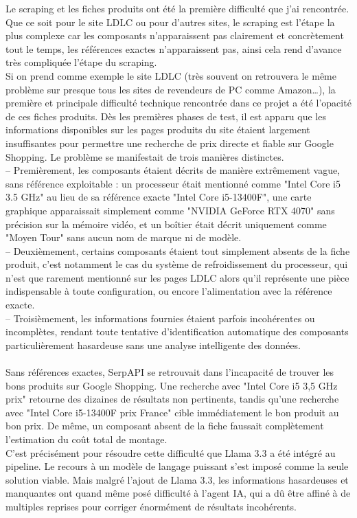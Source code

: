 \documentclass[a4paper, 12pt, twoside]{article}
\begin{document}
Le scraping et les fiches produits ont été la première difficulté que j'ai rencontrée.\\
Que ce soit pour le site LDLC ou pour d’autres sites, le scraping est l’étape la plus complexe car les composants n’apparaissent pas clairement et concrètement tout le temps, les références exactes n’apparaissent pas, ainsi cela rend d’avance très compliquée l’étape du scraping.\\
Si on prend comme exemple le site LDLC (très souvent on retrouvera le même problème sur presque tous les sites de revendeurs de PC comme Amazon…), la première et principale difficulté technique rencontrée dans ce projet a été l'opacité de ces fiches produits. Dès les premières phases de test, il est apparu que les informations disponibles sur les pages produits du site étaient largement insuffisantes pour permettre une recherche de prix directe et fiable sur Google Shopping. Le problème se manifestait de trois manières distinctes.\\
– Premièrement, les composants étaient décrits de manière extrêmement vague, sans référence exploitable : un processeur était mentionné comme "Intel Core i5 3.5 GHz" au lieu de sa référence exacte "Intel Core i5-13400F", une carte graphique apparaissait simplement comme "NVIDIA GeForce RTX 4070" sans précision sur la mémoire vidéo, et un boîtier était décrit uniquement comme "Moyen Tour" sans aucun nom de marque ni de modèle.\\
– Deuxièmement, certains composants étaient tout simplement absents de la fiche produit, c’est notamment le cas du système de refroidissement du processeur, qui n'est que rarement mentionné sur les pages LDLC alors qu'il représente une pièce indispensable à toute configuration, ou encore l’alimentation avec la référence exacte.\\
– Troisièmement, les informations fournies étaient parfois incohérentes ou incomplètes, rendant toute tentative d'identification automatique des composants particulièrement hasardeuse sans une analyse intelligente des données.\\
\\
Sans références exactes, SerpAPI se retrouvait dans l'incapacité de trouver les bons produits sur Google Shopping. Une recherche avec "Intel Core i5 3,5 GHz prix" retourne des dizaines de résultats non pertinents, tandis qu'une recherche avec "Intel Core i5-13400F prix France" cible immédiatement le bon produit au bon prix. De même, un composant absent de la fiche faussait complètement l'estimation du coût total de montage.\\
C'est précisément pour résoudre cette difficulté que Llama 3.3 a été intégré au pipeline.  Le recours à un modèle de langage puissant s'est imposé comme la seule solution viable. Mais malgré l’ajout de Llama 3.3, les informations hasardeuses et manquantes ont quand même posé difficulté à l’agent IA, qui a dû être affiné à de multiples reprises pour corriger énormément de résultats incohérents. \\
\\
\end{document}
